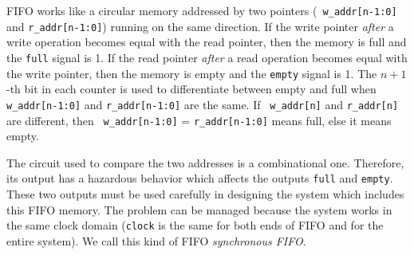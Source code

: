 FIFO works like a circular memory addressed by two pointers ({\tt
w\_addr[n-1:0]} and {\tt r\_addr[n-1:0]}) running on the same
direction. If the write pointer {\em after} a write operation
becomes equal with the read pointer, then the memory is  full and
the {\tt full} signal is 1. If the read pointer {\em after} a read
operation becomes equal with the write pointer, then the memory is
empty and the {\tt empty} signal is 1. The $n+1$-th bit in each
counter is used to differentiate between empty and full when {\tt
w\_addr[n-1:0]} and {\tt r\_addr[n-1:0]} are the same. If {\tt
w\_addr[n]} and {\tt r\_addr[n]} are different, then {\tt
w\_addr[n-1:0]} = {\tt r\_addr[n-1:0]} means full, else it means
empty.

The circuit used to compare the two addresses is a combinational
one. Therefore, its output has a hazardous behavior which affects
the outputs {\tt full} and {\tt empty}. These two outputs must be
used carefully in designing the system which includes this FIFO
memory. The problem can be managed because the system works in the
same clock domain ({\tt clock} is the same for both ends of FIFO
and for the entire system). We call this kind of FIFO {\em
synchronous FIFO}.

